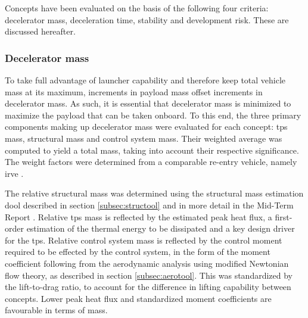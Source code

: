 Concepts have been evaluated on the basis of the following four criteria: decelerator mass, deceleration time, stability and development risk. These are discussed hereafter.

\subsubsection{Decelerator mass}
To take full advantage of launcher capability and therefore keep total vehicle mass at its maximum, increments in payload mass offset increments in decelerator mass. As such, it is essential that decelerator mass is minimized to maximize the payload that can be taken onboard. To this end, the three primary components making up decelerator mass were evaluated for each concept: \acrfull{tps} mass, structural mass and control system mass. Their weighted average was computed to yield a total mass, taking into account their respective significance. The weight factors were determined from a comparable re-entry vehicle, namely \gls{irve} \cite{Hughes2005}.

The relative structural mass was determined using the structural mass estimation dool described in section \ref{subsec:structool} and in more detail in the Mid-Term Report \cite[p.47-66]{Balasooriyan2015b}. Relative \gls{tps} mass is reflected by the estimated peak heat flux, a first-order estimation of the thermal energy to be dissipated and a key design driver for the \gls{tps}. Relative control system mass is reflected by the control moment required to be effected by the control system, in the form of the moment coefficient following from the aerodynamic analysis using modified Newtonian flow theory, as described in section \ref{subsec:aerotool}. This was standardized by the lift-to-drag ratio, to account for the difference in lifting capability between concepts. Lower peak heat flux and standardized moment coefficients are favourable in terms of mass. 

